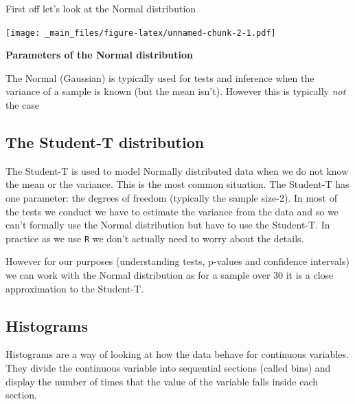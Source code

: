 \documentclass[
]{gitbook}
\begin{document}
First off let's look at the Normal distribution

\texttt{[image: \_main\_files/figure-latex/unnamed-chunk-2-1.pdf]}

\textbf{Parameters of the Normal distribution}


The Normal (Gaussian) is typically used for tests and inference when the variance of a sample is known (but the mean isn't). However this is typically \emph{not} the case

\hypertarget{the-student-t-distribution}{%
\subsection{The Student-T distribution}\label{the-student-t-distribution}}

The Student-T is used to model Normally distributed data when we do not know the mean or the variance. This is the most common situation. The Student-T has one parameter: the degrees of freedom (typically the sample size-2). In most of the tests we conduct we have to estimate the variance from the data and so we can't formally use the Normal distribution but have to use the Student-T. In practice as we use \texttt{R} we don't actually need to worry about the details.

However for our purposes (understanding tests, p-values and confidence intervals) we can work with the Normal distribution as for a sample over 30 it is a close approximation to the Student-T.

\hypertarget{histograms}{%
\subsection{Histograms}\label{histograms}}

Histograms are a way of looking at how the data behave for continuous variables. They divide the continuous variable into sequential sections (called bins) and display the number of times that the value of the variable falls inside each section.
\end{document}
